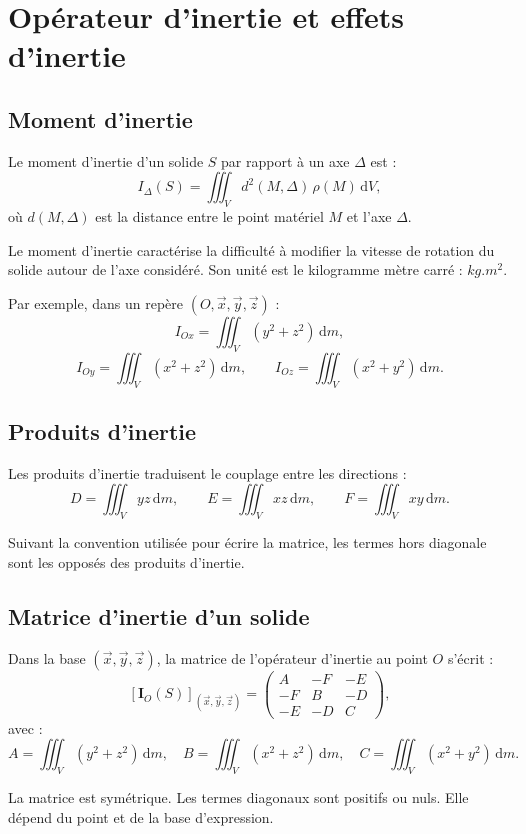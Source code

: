 \section{Opérateur d'inertie et effets d'inertie}

\subsection{Moment d'inertie}

Le moment d'inertie d'un solide $S$ par rapport à un axe $\Delta$ est :
\[
I_\Delta(S)=\iiint_V d^2(M,\Delta)\,\rho(M)\,\mathrm dV,
\]
où $d(M,\Delta)$ est la distance entre le point matériel $M$ et l'axe $\Delta$.

Le moment d'inertie caractérise la difficulté à modifier la vitesse de rotation du solide autour de l'axe considéré. Son unité est le kilogramme mètre carré : $\si{kg.m^2}$.

Par exemple, dans un repère $(O,\vec x,\vec y,\vec z)$ :
\[
I_{Ox}=\iiint_V (y^2+z^2)\,\mathrm dm,
\]
\[
I_{Oy}=\iiint_V (x^2+z^2)\,\mathrm dm,
\qquad
I_{Oz}=\iiint_V (x^2+y^2)\,\mathrm dm.
\]

\subsection{Produits d'inertie}

Les produits d'inertie traduisent le couplage entre les directions :
\[
D=\iiint_V yz\,\mathrm dm,
\qquad
E=\iiint_V xz\,\mathrm dm,
\qquad
F=\iiint_V xy\,\mathrm dm.
\]

Suivant la convention utilisée pour écrire la matrice, les termes hors diagonale sont les opposés des produits d'inertie.

\subsection{Matrice d'inertie d'un solide}

Dans la base $(\vec x,\vec y,\vec z)$, la matrice de l'opérateur d'inertie au point $O$ s'écrit :
\[
\left[\mathbf I_O(S)\right]_{(\vec x,\vec y,\vec z)}=
\begin{pmatrix}
A & -F & -E\\
-F & B & -D\\
-E & -D & C
\end{pmatrix},
\]
avec :
\[
A=\iiint_V (y^2+z^2)\,\mathrm dm,
\quad
B=\iiint_V (x^2+z^2)\,\mathrm dm,
\quad
C=\iiint_V (x^2+y^2)\,\mathrm dm.
\]

La matrice est symétrique. Les termes diagonaux sont positifs ou nuls. Elle dépend du point et de la base d'expression.

